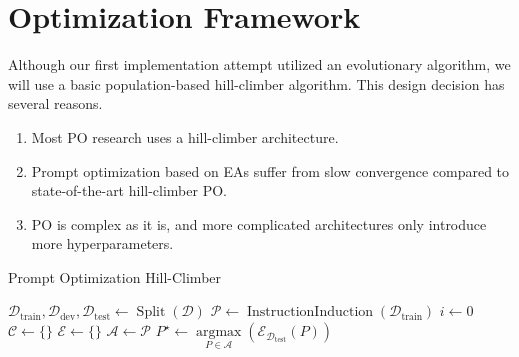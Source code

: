 \section{Optimization Framework}
Although our first implementation attempt utilized an evolutionary algorithm, we will use a basic population-based hill-climber algorithm.
This design decision has several reasons.
\begin{enumerate}
    \item Most PO research uses a hill-climber architecture.
    \item Prompt optimization based on EAs suffer from slow convergence compared to state-of-the-art hill-climber PO\cite{xiang2025selfsupervisedpromptoptimization}.
    \item PO is complex as it is, and more complicated architectures only introduce more hyperparameters.
\end{enumerate}


\begin{algorithm}
    \caption{Prompt Optimization Hill-Climber}
    \label{alg:promptoptimloop}
    $\mathcal{D}_{\text{train}}, \mathcal{D}_{\text{dev}}, \mathcal{D}_{\text{test}} \gets \operatorname{Split}(\mathcal{D})$ 
    $\mathscr{P} \gets \operatorname{InstructionInduction}(\mathcal{D}_{\text{train}})$ 
    $i \gets 0$ 
    $\mathcal{C} \gets \{\}$  
    $\mathcal{E} \gets \{\}$ 
    $\mathcal{A} \gets \mathscr{P}$ 
    $P^{\star} \gets \underset{P\in\mathcal{A}}{\operatorname{argmax}}(\mathcal{E}_{\mathcal{D}_{\text{test}}}(P))$\\
\end{algorithm}

